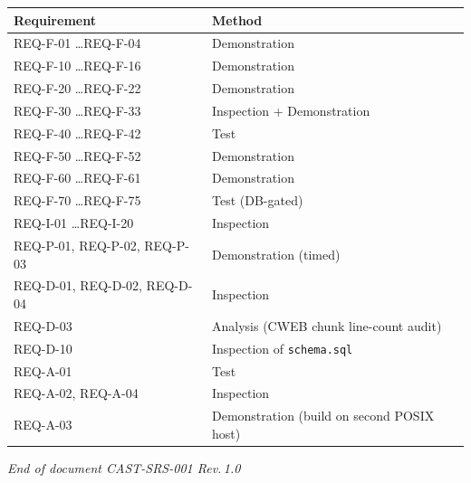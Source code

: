 \documentclass[12pt]{article}
\begin{document}
\begin{center}
\begin{longtable}{ll}
  \toprule
  \textbf{Requirement} & \textbf{Method} \\
  \midrule\endhead
  REQ-F-01 \ldots REQ-F-04 & Demonstration \\
  REQ-F-10 \ldots REQ-F-16 & Demonstration \\
  REQ-F-20 \ldots REQ-F-22 & Demonstration \\
  REQ-F-30 \ldots REQ-F-33 & Inspection + Demonstration \\
  REQ-F-40 \ldots REQ-F-42 & Test \\
  REQ-F-50 \ldots REQ-F-52 & Demonstration \\
  REQ-F-60 \ldots REQ-F-61 & Demonstration \\
  REQ-F-70 \ldots REQ-F-75 & Test (DB-gated) \\
  REQ-I-01 \ldots REQ-I-20 & Inspection \\
  REQ-P-01, REQ-P-02, REQ-P-03 & Demonstration (timed) \\
  REQ-D-01, REQ-D-02, REQ-D-04 & Inspection \\
  REQ-D-03                 & Analysis (CWEB chunk line-count audit) \\
  REQ-D-10                 & Inspection of \texttt{schema.sql} \\
  REQ-A-01                 & Test \\
  REQ-A-02, REQ-A-04       & Inspection \\
  REQ-A-03                 & Demonstration (build on second POSIX host) \\
  \bottomrule
\end{longtable}
\end{center}

\vfill
\begin{center}
  \small\textit{End of document CAST-SRS-001 Rev.\,1.0}
\end{center}
\end{document}
